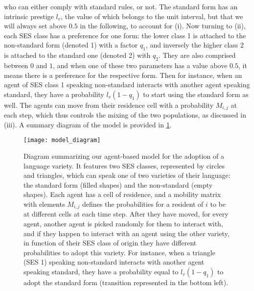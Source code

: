 \documentclass[../thesis.tex]{subfiles}
\begin{document}
who can either comply with standard rules, or not. The standard form has an intrinsic
prestige $l_v$, the value of which belongs to the unit interval, but that we will always
set above $0.5$ in the following, to account for (i). Now turning to (ii), each \ac{SES}
class has a preference for one form: the lower class 1 is attached to the non-standard
form (denoted 1) with a factor $q_1$, and inversely the higher class 2 is attached to
the standard one (denoted 2) with $q_2$. They are also comprised between $0$ and $1$,
and when one of these two parameters has a value above $0.5$, it means there is a
preference for the respective form. Then for instance, when an agent of \ac{SES} class 1
speaking non-standard interacts with another agent speaking standard, they have a
probability $l_v (1 - q_1)$ to start using the standard form as well. The agents can
move from their residence cell with a probability $M_{i,j}$ at each step, which thus
controls the mixing of the two populations, as discussed in (iii). A summary diagram of
the model is provided in \cref{fig:ses_ling_model_diagram}.
\begin{figure}
\centering
  \texttt{[image: model\_diagram]}
  \caption{Diagram summarizing our agent-based model for the adoption of a language
  variety. It features two \ac{SES} classes, represented by circles and triangles, which
  can speak one of two varieties of their language: the standard form (filled shapes)
  and the non-standard (empty shapes). Each agent has a cell of residence, and a
  mobility matrix with elements $M_{i, j}$ defines the probabilities for a resident of
  $i$ to be at different cells at each time step. After they have moved, for every
  agent, another agent is picked randomly for them to interact with, and if they happen
  to interact with an agent using the other variety, in function of their \ac{SES} class
  of origin they have different probabilities to adopt this variety. For instance, when
  a triangle (\ac{SES} 1) speaking non-standard interacts with another agent speaking
  standard, they have a probability equal to $l_v (1 - q_1)$ to adopt the standard form
  (transition represented in the bottom left).}
  \label{fig:ses_ling_model_diagram}
\end{figure}
\end{document}
